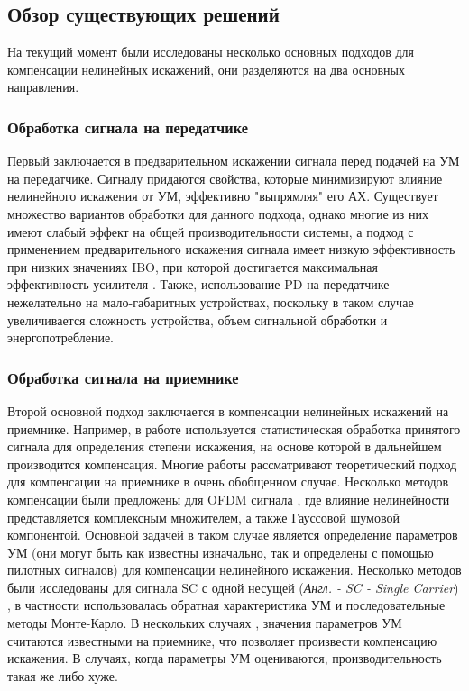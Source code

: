 \subsection{Обзор существующих решений}
На текущий момент были исследованы несколько основных подходов для
компенсации нелинейных искажений, они разделяются на два основных
направления.

\subsubsection{Обработка сигнала на передатчике}

Первый заключается в предварительном искажении сигнала перед
подачей на УМ на передатчике. Сигналу придаются свойства, которые
минимизируют влияние нелинейного искажения от УМ, эффективно "выпрямляя"
его АХ. Существует множество вариантов обработки для данного подхода,
однако многие из них имеют слабый эффект на общей производительности
системы, а подход с применением предварительного искажения сигнала имеет
низкую эффективность при низких значениях IBO, при которой достигается
максимальная эффективность усилителя \cite{sharath2015}
\cite{shabany2008} \cite{eda2001}. Также, использование PD на передатчике
нежелательно на мало-габаритных устройствах, поскольку в таком случае
увеличивается сложность устройства, объем сигнальной обработки и энергопотребление.

\subsubsection{Обработка сигнала на приемнике}

Второй основной подход заключается в компенсации нелинейных искажений на
приемнике. Например, в работе \cite{maltsev2021} используется
статистическая обработка принятого сигнала для определения степени
искажения, на основе которой в дальнейшем производится компенсация. Многие
работы \cite[]{sharath2015, shabany2008,bhat2016,qi2010,gregorio2007,
bouhadda2015,drotar2010} рассматривают теоретический подход для компенсации
на приемнике в очень обобщенном случае. Несколько методов компенсации были
предложены для OFDM сигнала \cite[]{gregorio2007,bouhadda2015, drotar2010},
где влияние нелинейности представляется комплексным множителем, а также
Гауссовой шумовой компонентой. Основной задачей в таком случае является
определение параметров УМ (они могут быть как известны изначально, так и
определены с помощью пилотных сигналов) для компенсации нелинейного
искажения. Несколько методов были исследованы для сигнала SC с одной несущей
(\textit{Англ. - SC - Single Carrier}) \cite[]{sharath2015,
shabany2008,bhat2016, qi2010}, в частности использовалась обратная
характеристика УМ и последовательные методы Монте-Карло. В нескольких
случаях \cite[]{bhat2016, qi2010,gregorio2007}, значения параметров УМ
считаются известными на приемнике, что позволяет произвести компенсацию
искажения. В случаях, когда параметры УМ оцениваются, производительность
такая же либо хуже.

